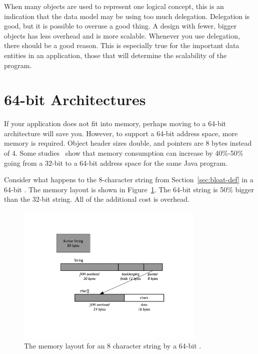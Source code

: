 When many objects are used to represent one logical concept, this is an indication that the data model may be using too much delegation. Delegation is good, but it is possible to overuse a good thing.  A design with fewer, bigger objects has less overhead and is more scalable. Whenever you use delegation, there should be a good reason. This is especially true for the important data entities in an application, those that will determine the scalability of the program.  
 

\section{64-bit Architectures}

If your application does not fit into memory, perhaps moving to a 64-bit architecture will save you. 
However, to support a 64-bit address space, more memory is required. Object header sizes double, and pointers are
8 bytes instead of 4. Some studies~\cite{compressedAddress} show that memory consumption can increase by 40\%-50\%
going from a 32-bit to a 64-bit address space for the same Java program.

Consider what happens to the 8-character string from
Section~\ref{sec:bloat-def} in a 64-bit \jre. The memory layout is shown in
Figure~\ref{fig:8-char-string-64-bit}. The 64-bit string is 50\% bigger than the 32-bit string. All of the
additional cost is overhead.
 
 \begin{figure}
  \centering

 \includegraphics[width=0.8\textwidth]{part1/Figures/modelingdatatypes/8-char-string-64-bit.pdf}
  \caption{The memory layout for an 8 character string by a 64-bit \jre.}
  \label{fig:8-char-string-64-bit}
\end{figure}

